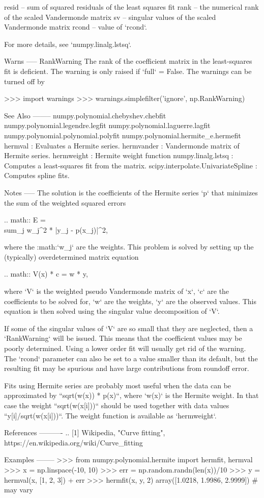 \begin{DoxyVerb}
    resid -- sum of squared residuals of the least squares fit
    rank -- the numerical rank of the scaled Vandermonde matrix
    sv -- singular values of the scaled Vandermonde matrix
    rcond -- value of `rcond`.

    For more details, see `numpy.linalg.lstsq`.

Warns
-----
RankWarning
    The rank of the coefficient matrix in the least-squares fit is
    deficient. The warning is only raised if `full` = False.  The
    warnings can be turned off by

    >>> import warnings
    >>> warnings.simplefilter('ignore', np.RankWarning)

See Also
--------
numpy.polynomial.chebyshev.chebfit
numpy.polynomial.legendre.legfit
numpy.polynomial.laguerre.lagfit
numpy.polynomial.polynomial.polyfit
numpy.polynomial.hermite_e.hermefit
hermval : Evaluates a Hermite series.
hermvander : Vandermonde matrix of Hermite series.
hermweight : Hermite weight function
numpy.linalg.lstsq : Computes a least-squares fit from the matrix.
scipy.interpolate.UnivariateSpline : Computes spline fits.

Notes
-----
The solution is the coefficients of the Hermite series `p` that
minimizes the sum of the weighted squared errors

.. math:: E = \\sum_j w_j^2 * |y_j - p(x_j)|^2,

where the :math:`w_j` are the weights. This problem is solved by
setting up the (typically) overdetermined matrix equation

.. math:: V(x) * c = w * y,

where `V` is the weighted pseudo Vandermonde matrix of `x`, `c` are the
coefficients to be solved for, `w` are the weights, `y` are the
observed values.  This equation is then solved using the singular value
decomposition of `V`.

If some of the singular values of `V` are so small that they are
neglected, then a `RankWarning` will be issued. This means that the
coefficient values may be poorly determined. Using a lower order fit
will usually get rid of the warning.  The `rcond` parameter can also be
set to a value smaller than its default, but the resulting fit may be
spurious and have large contributions from roundoff error.

Fits using Hermite series are probably most useful when the data can be
approximated by ``sqrt(w(x)) * p(x)``, where `w(x)` is the Hermite
weight. In that case the weight ``sqrt(w(x[i]))`` should be used
together with data values ``y[i]/sqrt(w(x[i]))``. The weight function is
available as `hermweight`.

References
----------
.. [1] Wikipedia, "Curve fitting",
       https://en.wikipedia.org/wiki/Curve_fitting

Examples
--------
>>> from numpy.polynomial.hermite import hermfit, hermval
>>> x = np.linspace(-10, 10)
>>> err = np.random.randn(len(x))/10
>>> y = hermval(x, [1, 2, 3]) + err
>>> hermfit(x, y, 2)
array([1.0218, 1.9986, 2.9999]) # may vary\end{DoxyVerb}
